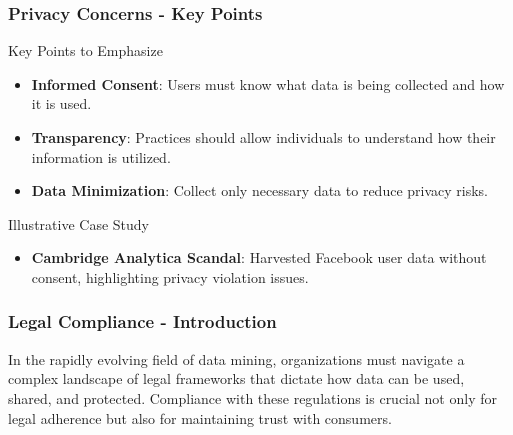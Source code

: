 \documentclass{beamer}
\begin{document}
\begin{frame}[fragile]
    \frametitle{Privacy Concerns - Key Points}
    
    \begin{block}{Key Points to Emphasize}
        \begin{itemize}
            \item \textbf{Informed Consent}: Users must know what data is being collected and how it is used.
            \item \textbf{Transparency}: Practices should allow individuals to understand how their information is utilized.
            \item \textbf{Data Minimization}: Collect only necessary data to reduce privacy risks.
        \end{itemize}
    \end{block}
    
    \begin{block}{Illustrative Case Study}
        \begin{itemize}
            \item \textbf{Cambridge Analytica Scandal}: Harvested Facebook user data without consent, highlighting privacy violation issues.
        \end{itemize}
    \end{block}
\end{frame}

\begin{frame}[fragile]
    \frametitle{Legal Compliance - Introduction}
    In the rapidly evolving field of data mining, organizations must navigate a complex landscape of legal frameworks that dictate how data can be used, shared, and protected. Compliance with these regulations is crucial not only for legal adherence but also for maintaining trust with consumers.
\end{frame}
\end{document}
